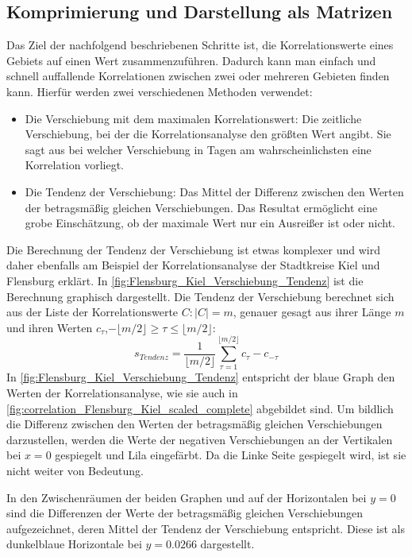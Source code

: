 \subsection{Komprimierung und Darstellung als Matrizen}\label{sec:Grundlagen:Korrelation:Komprimierung}
Das Ziel der nachfolgend beschriebenen Schritte ist, die Korrelationswerte eines Gebiets auf einen Wert zusammenzuführen. Dadurch kann man einfach und schnell auffallende Korrelationen zwischen zwei oder mehreren Gebieten finden kann.
Hierfür werden zwei verschiedenen Methoden verwendet:
\begin{itemize}
    \item Die Verschiebung mit dem maximalen Korrelationswert: Die zeitliche Verschiebung, bei der die Korrelationsanalyse den größten Wert angibt. Sie sagt aus bei welcher Verschiebung in Tagen am wahrscheinlichsten eine Korrelation vorliegt.
    \item Die Tendenz der Verschiebung: 
    Das Mittel der Differenz zwischen den Werten der betragsmäßig gleichen Verschiebungen.
    Das Resultat ermöglicht eine grobe Einschätzung, ob der maximale Wert nur ein Ausreißer ist oder nicht.
\end{itemize}

Die Berechnung der Tendenz der Verschiebung ist etwas komplexer und wird daher ebenfalls am Beispiel der Korrelationsanalyse der Stadtkreise Kiel und Flensburg erklärt.
In \autoref{fig:Flensburg_Kiel_Verschiebung_Tendenz} ist die Berechnung graphisch dargestellt.
Die Tendenz der Verschiebung berechnet sich aus der Liste der Korrelationswerte $C:\vert C\vert =m$, genauer gesagt aus ihrer Länge $m$ und ihren Werten $c_\tau$,$ -\lfloor m/2 \rfloor\geq \tau\leq \lfloor m/2 \rfloor$:
\begin{equation}
    s_{Tendenz} = \frac{1}{\lfloor m/2 \rfloor}
    \sum_{\tau=1}^{\lfloor m/2 \rfloor}c_{\tau}-c_{-\tau}
\end{equation}
In \autoref{fig:Flensburg_Kiel_Verschiebung_Tendenz} entspricht der blaue Graph den Werten der Korrelationsanalyse, wie sie auch in \autoref{fig:correlation_Flensburg_Kiel_scaled_complete} abgebildet sind. Um bildlich die Differenz zwischen den Werten der betragsmäßig gleichen Verschiebungen darzustellen, werden die Werte der negativen Verschiebungen an der Vertikalen bei $x=0$ gespiegelt und Lila eingefärbt.
Da die Linke Seite gespiegelt wird, ist sie nicht weiter von Bedeutung.

In den Zwischenräumen der beiden Graphen und auf der Horizontalen bei $y=0$ sind die Differenzen der Werte der betragsmäßig gleichen Verschiebungen aufgezeichnet, deren Mittel der Tendenz der Verschiebung entspricht. Diese ist als dunkelblaue Horizontale bei $y=0.0266$ dargestellt.

